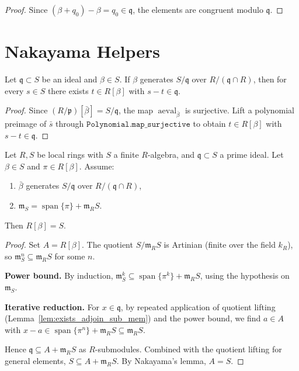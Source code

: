 \begin{proof}
  \leanok
  Since $(\beta + q_0) - \beta = q_0 \in \mathfrak{q}$, the elements are congruent
  modulo $\mathfrak{q}$.
\end{proof}

\section{Nakayama Helpers}


\begin{lemma}
  \label{lem:exists_adjoin_sub_mem}
  \leanok
  Let $\mathfrak{q} \subset S$ be an ideal and $\beta \in S$.
  If $\beta$ generates $S/\mathfrak{q}$ over $R/(\mathfrak{q} \cap R)$,
  then for every $s \in S$ there exists $t \in R[\beta]$ with $s - t \in \mathfrak{q}$.
\end{lemma}

\begin{proof}
  \leanok
  Since $(R/\mathfrak{p})[\bar\beta] = S/\mathfrak{q}$, the map
  $\operatorname{aeval}_{\bar\beta}$ is surjective.
  Lift a polynomial preimage of $\bar s$ through
  $\mathtt{Polynomial.map\_surjective}$ to obtain $t \in R[\beta]$
  with $s - t \in \mathfrak{q}$.
\end{proof}

\begin{lemma}
  \label{lem:adjoin_eq_top_of_quotient}
  \leanok
  Let $R, S$ be local rings with $S$ a finite $R$-algebra, and $\mathfrak{q} \subset S$
  a prime ideal.  Let $\beta \in S$ and $\pi \in R[\beta]$.
  Assume:
  \begin{enumerate}
    \item $\bar\beta$ generates $S/\mathfrak{q}$ over $R/(\mathfrak{q} \cap R)$,
    \item $\mathfrak{m}_S = \operatorname{span}\{\pi\} + \mathfrak{m}_R S$.
  \end{enumerate}
  Then $R[\beta] = S$.
\end{lemma}

\begin{proof}
  \leanok
  Set $A = R[\beta]$.  The quotient $S/\mathfrak{m}_R S$ is Artinian
  (finite over the field $k_R$), so $\mathfrak{m}_S^n \subseteq \mathfrak{m}_R S$
  for some $n$.

  \textbf{Power bound.} By induction,
  $\mathfrak{m}_S^k \subseteq \operatorname{span}\{\pi^k\} + \mathfrak{m}_R S$,
  using the hypothesis on $\mathfrak{m}_S$.

  \textbf{Iterative reduction.} For $x \in \mathfrak{q}$, by repeated application
  of quotient lifting (Lemma~\ref{lem:exists_adjoin_sub_mem}) and the power bound,
  we find $a \in A$ with $x - a \in \operatorname{span}\{\pi^n\} + \mathfrak{m}_R S
  \subseteq \mathfrak{m}_R S$.

  Hence $\mathfrak{q} \subseteq A + \mathfrak{m}_R S$ as $R$-submodules.
  Combined with the quotient lifting for general elements,
  $S \subseteq A + \mathfrak{m}_R S$.
  By Nakayama's lemma, $A = S$.
\end{proof}


